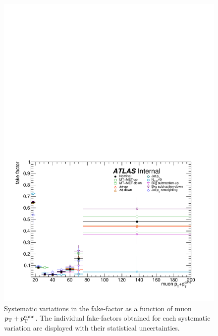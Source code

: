 \begin{figure}[htbp]
  \centering
  \includegraphics[width=.6\textwidth]{figs/ssww_13tev/backgrounds/ff/muon_ff_sys}
  \caption{Systematic variations in the fake-factor as a function of muon $p_{\mathrm{T}}+p_{\mathrm{T}}^{\textrm{cone}}$.  The individual fake-factors obtained for each systematic variation are displayed with their statistical uncertainties.}
  \label{fig:ssww13tev_ff_muon_sys}
\end{figure}

